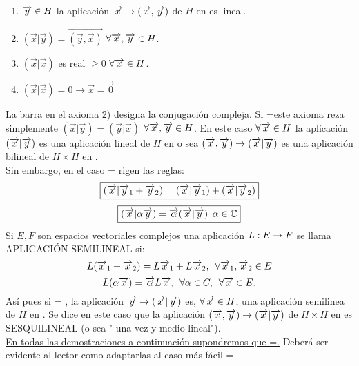 \begin{enumerate}[1)]
\item \todo $\overrightarrow{y} \in H$ la aplicación $\overrightarrow{x} \rightarrow (\overrightarrow{x},\overrightarrow{y})$ de $H$ en \K \phantom{} es lineal.
\item $(\overrightarrow{x}|\overrightarrow{y})=\overrightarrow{(\overrightarrow{y},\overrightarrow{x})}$ $\forall \overrightarrow{x},\overrightarrow{y} \in H$.
\item $(\overrightarrow{x}|\overrightarrow{x})$ es real $ \geq 0$ $\forall \overrightarrow{x} \in H$.
\item $(\overrightarrow{x}|\overrightarrow{x})=0 \to \overrightarrow{x}=\overrightarrow{0}$

\end{enumerate}
La barra en el axioma 2) designa la conjugación compleja. Si \K =\R  este axioma reza simplemente $(\overrightarrow{x}|\overrightarrow{y})=(\overrightarrow{y}
|\overrightarrow{x})$ $\forall \overrightarrow{x},\overrightarrow{y} \in H$. En este caso $\forall \overrightarrow{x} \in H$ la aplicación \yraya \flecha $(\overrightarrow{x}|\overrightarrow{y})$ es una aplicación lineal de $H$ en \K \phantom{} o sea $(\overrightarrow{x} , \overrightarrow{y}) \rightarrow (\overrightarrow{x} | \overrightarrow{y})$ es una aplicación bilineal de $H \times H$ en \K . \\
Sin embargo, en el caso \K = \C \phantom{} rigen las reglas: 
\begin{equation*}
\boxed{(\overrightarrow{x} | \overrightarrow{y}_1 + \overrightarrow{y}_2)=(\overrightarrow{x}|\overrightarrow{y}_1)+(\overrightarrow{x}|\overrightarrow{y}_2)}
\end{equation*}
\begin{equation*}
\boxed{(\overrightarrow{x}|\alpha \overrightarrow{y})=\overrightarrow{\alpha}(\overrightarrow{x}|\overrightarrow{y}) \phantom{s} \alpha \in \mathbb{C}}
\end{equation*}
Si $E,F$ son espacios vectoriales complejos una aplicación $L:E \rightarrow F$ se llama APLICACIÓN SEMILINEAL si:
$$
L(\overrightarrow{x}_1+\overrightarrow{x}_2)=L\overrightarrow{x}_1+L\overrightarrow{x}_2, \phantom{s} \forall \overrightarrow{x}_1, \overrightarrow{x}_2 \in E
$$
$$
L(\alpha \overrightarrow{x})=\overrightarrow{\alpha}L\overrightarrow{x}, \phantom{s} \forall \alpha \in C, \phantom{s} \forall \overrightarrow{x} \in E.
$$
Así pues si \K = \C , la aplicación $\overrightarrow{y} \rightarrow (\overrightarrow{x} | \overrightarrow{y})$ es, $\forall \overrightarrow{x} \in H$, una aplicación semilinea de $H$ en \C . Se dice en este caso que la aplicación $(\overrightarrow{x},\overrightarrow{y}) \rightarrow (\overrightarrow{x}|\overrightarrow{y}) $ de $H \times H$ en \C \phantom{} es SESQUILINEAL (o sea " una vez y medio lineal").  \\
\underline{En todas las demostraciones a continuación supondremos que \K=\C .} Deberá ser evidente al lector como adaptarlas al caso más fácil \K=\R . \\

